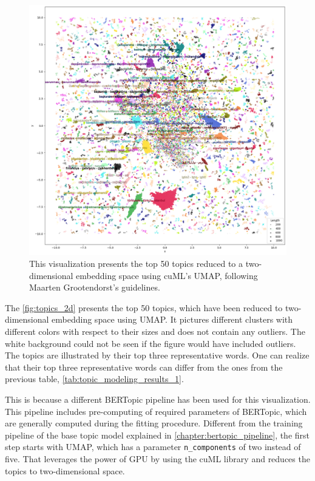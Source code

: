\begin{figure}[h!]
    \centering
    \includegraphics[width=\linewidth]{figures/visualization_2d.png}
    \caption[The Top 50 Topics Visualized in Two-Dimensional Embedding Space Using cuML's UMAP]
    {This visualization presents the top 50 topics reduced to a two-dimensional embedding space using 
    cuML's UMAP, following Maarten Grootendorst's guidelines\footnotemark.}\label{fig:topics_2d}
\end{figure}

The \autoref{fig:topics_2d} presents the top 50 topics, which have been reduced to 
two-dimensional embedding space using UMAP.
It pictures different clusters with different colors with respect to their sizes and 
does not contain any outliers. The white background could not be seen if the figure would 
have included outliers. 
The topics are illustrated by their top three representative words. One can realize that 
their top three representative words can differ from the ones from the previous table, 
\autoref{tab:topic_modeling_results_1}. 

This is because a different BERTopic pipeline has been used for this visualization. 
This pipeline includes pre-computing of required parameters of BERTopic, which are generally 
computed during the fitting procedure. Different from the training pipeline of the base topic 
model explained in \autoref{chapter:bertopic_pipeline}, the first step starts with UMAP, 
which has a parameter \texttt{n\_components} of two instead of five. 
That leverages the power of GPU by using the cuML library and reduces the topics to two-dimensional 
space. 

